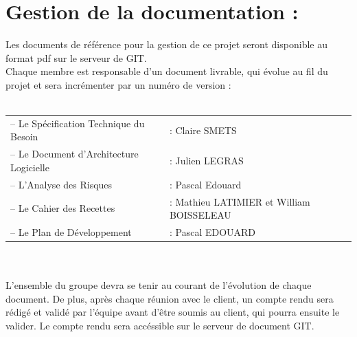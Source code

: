 \documentclass[a4paper,11pt,french]{article}
\begin{document}
\newpage

\section{Gestion de la documentation :}
Les documents de référence pour la gestion de ce projet seront disponible au format pdf sur le serveur de GIT. \\

Chaque membre est responsable d'un document livrable, qui évolue au fil du projet et sera incrémenter par un numéro de version :\\ \\
\begin{tabular}{ll}
–	Le Spécification Technique du Besoin 	& : Claire SMETS\\
–	Le Document d'Architecture Logicielle 	& : Julien LEGRAS\\
–	L'Analyse des Risques 					& : Pascal Edouard\\
–	Le Cahier des Recettes 					& : Mathieu LATIMIER et William BOISSELEAU\\
–	Le Plan de Développement 				& : Pascal EDOUARD\\
\end{tabular}
\\ \\
L'ensemble du groupe devra se tenir au courant de l'évolution de chaque document. De plus, après chaque réunion avec le client, un compte rendu sera rédigé et validé par l'équipe avant d'être soumis au client, qui pourra ensuite le valider. Le compte rendu sera accéssible sur le serveur de document GIT.
\end{document}
